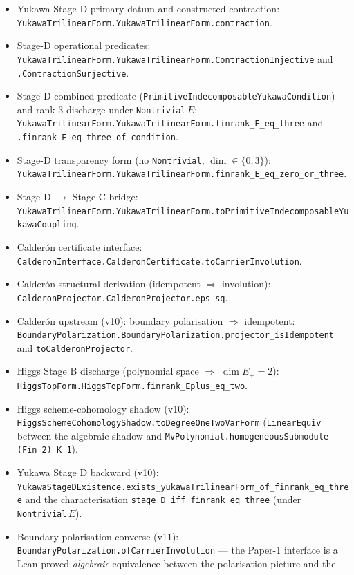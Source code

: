 \begin{tfptexports}
\begin{itemize}[leftmargin=1.5em, itemsep=0pt]
  \texttt{YukawaPrimitive.PrimitiveIndecomposableYukawaCoupling.toYukawaTopForm}.
\item Yukawa Stage-D primary datum and constructed contraction:
  \texttt{YukawaTrilinearForm.YukawaTrilinearForm.contraction}.
\item Stage-D operational predicates:
  \texttt{YukawaTrilinearForm.YukawaTrilinearForm.ContractionInjective} and \texttt{.ContractionSurjective}.
\item Stage-D combined predicate
  (\texttt{PrimitiveIndecomposableYukawaCondition}) and
  rank-3 discharge under \texttt{Nontrivial}\,$E$:
  \texttt{YukawaTrilinearForm.YukawaTrilinearForm.finrank\_E\_eq\_three}
  and \texttt{.finrank\_E\_eq\_three\_of\_condition}.
\item Stage-D transparency form (no \texttt{Nontrivial}, $\dim
  \in \{0,3\}$): \texttt{YukawaTrilinearForm.YukawaTrilinearForm.finrank\_E\_eq\_zero\_or\_three}.
\item Stage-D $\to$ Stage-C bridge:
  \texttt{YukawaTrilinearForm.YukawaTrilinearForm.toPrimitiveIndecomposableYukawaCoupling}.
\item Calderón certificate interface:
  \texttt{CalderonInterface.CalderonCertificate.toCarrierInvolution}.
\item Calderón structural derivation (idempotent $\Rightarrow$
  involution): \texttt{CalderonProjector.CalderonProjector.eps\_sq}.
\item Calderón upstream (v10): boundary polarisation $\Rightarrow$
  idempotent:
  \texttt{BoundaryPolarization.BoundaryPolarization.projector\_isIdempotent}
  and \texttt{toCalderonProjector}.
\item Higgs Stage B discharge (polynomial space $\Rightarrow$
  $\dim E_+ = 2$):
  \texttt{HiggsTopForm.HiggsTopForm.finrank\_Eplus\_eq\_two}.
\item Higgs scheme-cohomology shadow (v10):
  \texttt{HiggsSchemeCohomologyShadow.toDegreeOneTwoVarForm}
  (\texttt{LinearEquiv} between the algebraic shadow and
  \texttt{MvPolynomial.homogeneousSubmodule (Fin 2) K 1}).
\item Yukawa Stage D backward (v10):
  \texttt{YukawaStageDExistence.exists\_yukawaTrilinearForm\_of\_finrank\_eq\_three}
  and the characterisation
  \texttt{stage\_D\_iff\_finrank\_eq\_three} (under
  \texttt{Nontrivial}\,$E$).
\item Boundary polarisation converse (v11):
  \texttt{BoundaryPolarization.ofCarrierInvolution}
  --- the Paper-1 interface is a Lean-proved \emph{algebraic}
  equivalence between the polarisation picture and the

\end{itemize}
\end{tfptexports}
